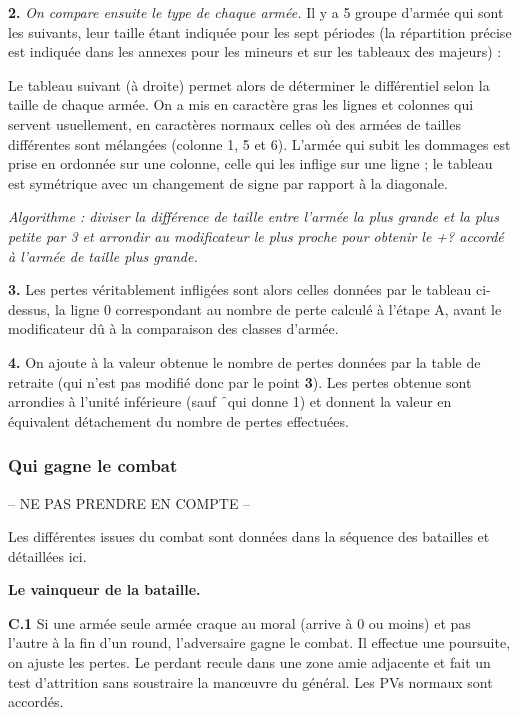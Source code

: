 {\bf 2.}
\textit{On compare ensuite le type de chaque armée.} Il y a 5 groupe d'armée qui sont 
les suivants, leur taille étant indiquée pour les sept périodes (la répartition précise est
indiquée dans les annexes pour les mineurs et sur les tableaux des majeurs) :


Le tableau suivant (à droite) permet alors de déterminer le différentiel selon la taille de 
chaque armée. On a mis en caractère gras les lignes et colonnes qui servent 
usuellement, en caractères normaux celles où des armées
de tailles différentes sont mélangées (colonne 1, 5 et 6).
L'armée qui subit les 
dommages est prise en ordonnée sur une colonne, celle qui les inflige sur une
ligne ; le tableau est 
symétrique avec un changement de signe par rapport à la diagonale.


\textit{Algorithme : diviser la différence de taille entre l'armée la plus grande et la plus
petite par 3 et arrondir au modificateur le plus proche pour obtenir le +?
accordé à l'armée de taille plus grande.} 


{\bf 3.}
Les pertes véritablement infligées sont alors celles données par le tableau 
ci-dessus, la ligne 0 correspondant au nombre de perte calculé à l'étape A, 
avant le modificateur 
dû à la comparaison des classes d'armée.


{\bf 4.}
On ajoute à la valeur obtenue le nombre de pertes données par la table de 
retraite (qui n'est pas modifié donc par le point {\bf 3}).
Les pertes obtenue sont arrondies à l'unité inférieure (sauf \f\ qui donne 1)
et donnent la valeur en équivalent détachement du nombre de pertes effectuées.


\subsubsection{Qui gagne le combat}
-- NE PAS PRENDRE EN COMPTE --


Les différentes issues du combat sont données dans la séquence des batailles et
détaillées ici.

\textbf{Le vainqueur de la bataille.} 

{\bf C.1} Si une armée seule armée craque au moral (arrive à 0 ou moins) et pas l'autre à la fin
d'un round, l'adversaire gagne le combat. Il effectue une poursuite, on ajuste les
pertes. Le perdant recule dans une zone amie adjacente et fait un test d'attrition
sans soustraire la man{\oe}uvre du général. Les PVs normaux sont accordés.

